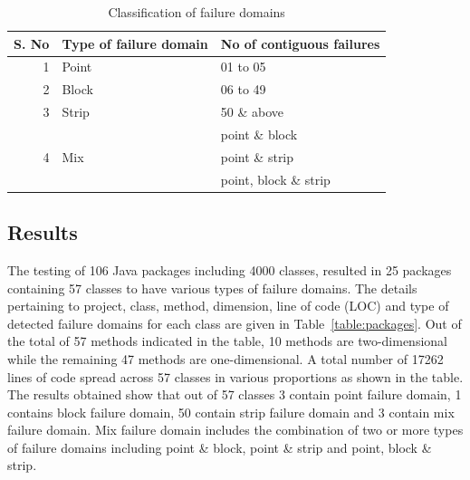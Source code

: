 \begin{table}[h]
\scriptsize
\caption{Classification of failure domains} 
\bigskip
\centering
{\renewcommand{\arraystretch}{1.5}
\begin{tabular}{| r | l | l |} 
\hline 
S. No 	&	Type of failure domain						& No of contiguous failures	 \\
				  
				 
				 
				 
\hline 
1		&	Point										 & 01 to 05							\\
\hline 
2		& 	Block										 & 06 to 49							\\
\hline 
3		&	Strip 										 & 50 \& above						 \\ 
\hline 
		&				 								 & point \& block						\\
4		& 	Mix											 & point \& strip 						\\
		&											        & point, block \& strip				\\
\hline
\end{tabular}
}
\label{table:resultsSummary} %
\end{table}
\bigskip
\bigskip


\subsection{Results}
The testing of 106 Java packages including 4000 classes, resulted in 25 packages containing 57 classes to have various types of failure domains. The details pertaining to project, class, method, dimension, line of code (LOC) and type of detected failure domains for each class are given in Table~\ref{table:packages}. Out of the total of 57 methods indicated in the table, 10 methods are two-dimensional while the remaining 47 methods are one-dimensional. A total number of 17262 lines of code spread across 57 classes in various proportions as shown in the table. The results obtained show that out of 57 classes 3 contain point failure domain, 1 contains block failure domain, 50 contain strip failure domain and 3 contain mix failure domain. Mix failure domain includes the combination of two or more types of failure domains including point \& block, point \& strip and point, block \& strip. 



